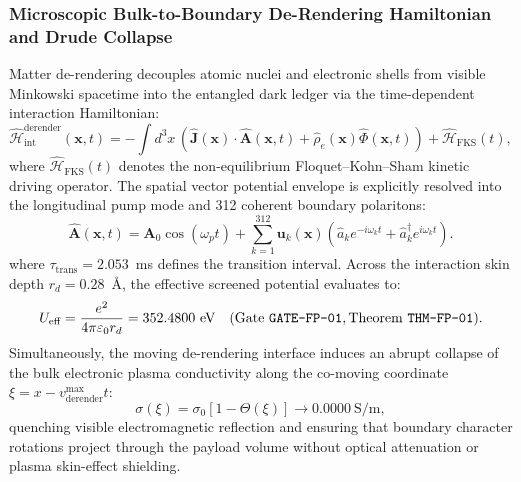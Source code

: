 \documentclass[11pt,onecolumn]{article}
\begin{document}
\subsubsection{Microscopic Bulk-to-Boundary De-Rendering Hamiltonian and Drude Collapse}
Matter de-rendering decouples atomic nuclei and electronic shells from visible Minkowski spacetime into the entangled dark ledger via the time-dependent interaction Hamiltonian:
\begin{equation}
\hat{\mathcal{H}}_{\text{int}}^{\text{derender}}(\mathbf{x}, t) = -\int d^3x \, \left( \hat{\mathbf{J}}(\mathbf{x}) \cdot \hat{\mathbf{A}}(\mathbf{x}, t) + \hat{\rho}_e(\mathbf{x}) \hat{\Phi}(\mathbf{x}, t) \right) + \hat{\mathcal{H}}_{\text{FKS}}(t),
\label{eq:fp_h_derender}
\end{equation}
where $\hat{\mathcal{H}}_{\text{FKS}}(t)$ denotes the non-equilibrium Floquet--Kohn--Sham kinetic driving operator. The spatial vector potential envelope is explicitly resolved into the longitudinal pump mode and 312 coherent boundary polaritons:
\begin{equation}
\hat{\mathbf{A}}(\mathbf{x}, t) = \mathbf{A}_0 \cos(\omega_p t) + \sum_{k=1}^{312} \mathbf{u}_k(\mathbf{x}) \left( \hat{a}_k e^{-i \omega_k t} + \hat{a}_k^\dagger e^{i \omega_k t} \right).
\label{eq:fp_a_envelope}
\end{equation}
where $\tau_{\text{trans}} = 2.053$~ms defines the transition interval. Across the interaction skin depth $r_d = 0.28$~\AA, the effective screened potential evaluates to:
\begin{equation}
U_{\text{eff}} = \frac{e^2}{4\pi\varepsilon_0 r_d} = 352.4800~\text{eV} \quad (\text{Gate \texttt{GATE-FP-01}}, \text{Theorem \texttt{THM-FP-01}}).
\label{eq:u_eff_val}
\end{equation}
Simultaneously, the moving de-rendering interface induces an abrupt collapse of the bulk electronic plasma conductivity along the co-moving coordinate $\xi = x - v_{\text{derender}}^{\max} t$:
\begin{equation}
\sigma(\xi) = \sigma_0 \left[1 - \Theta(\xi)\right] \longrightarrow 0.0000~\mathrm{S/m},
\label{eq:drude_collapse}
\end{equation}
quenching visible electromagnetic reflection and ensuring that boundary character rotations project through the payload volume without optical attenuation or plasma skin-effect shielding.
\end{document}
